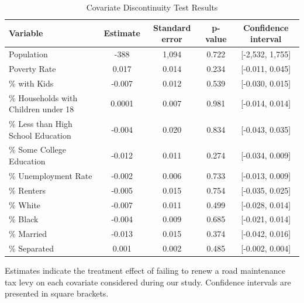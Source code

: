 \begin{table}[!h]
    \centering
    \caption{Covariate Discontinuity Test Results}
    \label{tab:covariate_discontinuity}
    \begin{tabular}{p{2cm}cccc}
        \hline
        Variable & Estimate & Standard error & p-value & Confidence interval \\
        \hline
        Population                           & -388      & 1,094   & 0.722  & [-2,532, 1,755] \\
        Poverty Rate                         & 0.017     & 0.014   & 0.234  & [-0.011, 0.045] \\
        \% with Kids                         & -0.007    & 0.012   & 0.539  & [-0.030, 0.015] \\
        \% Households with Children under 18 & 0.0001    & 0.007   & 0.981  & [-0.014, 0.014] \\
        \% Less than High School Education   & -0.004    & 0.020   & 0.834  & [-0.043, 0.035] \\
        \% Some College Education            & -0.012    & 0.011   & 0.274  & [-0.034, 0.009] \\
        \% Unemployment Rate                 & -0.002    & 0.006   & 0.733  & [-0.013, 0.009] \\
        \% Renters                           & -0.005    & 0.015   & 0.754  & [-0.035, 0.025] \\
        \% White                             & -0.007    & 0.011   & 0.499  & [-0.028, 0.014] \\
        \% Black                             & -0.004    & 0.009   & 0.685  & [-0.021, 0.014] \\
        \% Married                           & -0.013    & 0.015   & 0.374  & [-0.042, 0.016] \\
        \% Separated                         & 0.001     & 0.002   & 0.485  & [-0.002, 0.004] \\
        \hline
    \end{tabular}
    \begin{tablenotes}
        \small
        \item Estimates indicate the treatment effect of failing to renew a road maintenance tax levy on each covariate considered during our study. Confidence intervals are presented in square brackets.
    \end{tablenotes}
\end{table}


